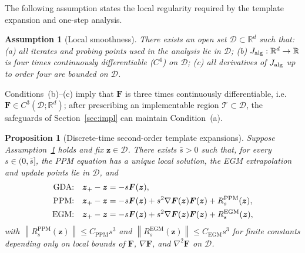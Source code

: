 \documentclass{article}
\newtheorem{proposition}{Proposition}
\newtheorem{assumption}{Assumption}
\theoremstyle{remark}
\newcommand{\R}{\mathbb{R}}
\newcommand{\norm}[1]{\left\lVert #1\right\rVert}
\newcommand{\cD}{\mathcal{D}}
\newcommand{\bz}{\boldsymbol{z}}
\newcommand{\bF}{\boldsymbol{F}}
\begin{document}
The following assumption states the local regularity required by the template expansion and one-step analysis.

\begin{assumption}[Local smoothness]\label{ass:smooth}
There exists an open set $\cD\subset\R^{d}$ such that:
(a) all iterates and probing points used in the analysis lie in $\cD$;
(b) $J_{\rm alg}:\R^{d}\to\R$ is four times continuously differentiable ($C^{4}$) on $\cD$;
(c) all derivatives of $J_{\rm alg}$ up to order four are bounded on $\cD$.
\end{assumption}

Conditions~(b)--(c) imply that $\bF$ is three times continuously differentiable, i.e. $\bF\in C^{3}(\cD;\R^{d})$; after prescribing an implementable region $\mathcal T\subset\cD$, the safeguards of Section~\ref{sec:impl} can maintain Condition~(a).

\begin{proposition}[Discrete-time second-order template expansions]\label{prop:DTA}
Suppose Assumption~\ref{ass:smooth} holds and fix $\bz\in\cD$.
There exists $\bar s>0$ such that, for every $s\in(0,\bar s]$, the PPM equation has a unique local solution, the EGM extrapolation and update points lie in $\cD$, and
\begin{align*}
\textnormal{GDA:}\quad \bz_{+}-\bz&=-s\bF(\bz),\\
\textnormal{PPM:}\quad \bz_{+}-\bz&=-s\bF(\bz)+s^{2}\nabla\bF(\bz)\bF(\bz)+R^{\mathrm{PPM}}_{s}(\bz),\\
\textnormal{EGM:}\quad \bz_{+}-\bz&=-s\bF(\bz)+s^{2}\nabla\bF(\bz)\bF(\bz)+R^{\mathrm{EGM}}_{s}(\bz),
\end{align*}
with $\norm{R^{\mathrm{PPM}}_{s}(\bz)}\le C_{\mathrm{PPM}}s^{3}$ and $\norm{R^{\mathrm{EGM}}_{s}(\bz)}\le C_{\mathrm{EGM}}s^{3}$ for finite constants depending only on local bounds of $\bF$, $\nabla\bF$, and $\nabla^{2}\bF$ on $\cD$.
\end{proposition}
\end{document}
